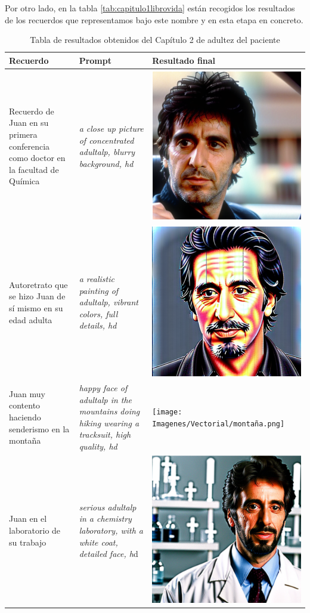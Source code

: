 Por otro lado, en la tabla \ref*{tab:capitulo1librovida} están recogidos los resultados de los recuerdos que representamos bajo este nombre y en esta etapa en concreto. \\

 \begin{table}
	\centering
	\begin{tabular}{>{\centering\arraybackslash}m{5cm} >{\arraybackslash}m{5cm}>{\arraybackslash}m{5cm}}
		\textbf{Recuerdo} & \textbf{Prompt} & \textbf{Resultado final} \\
		\hline
		Recuerdo de Juan en su primera conferencia como doctor en la facultad de Química & \textit{a close up picture of concentrated adultalp, blurry background, hd} & \includegraphics[width = 0.3
		\textwidth]{Imagenes/Vectorial/padultalp.png}\\
		\hline
		Autoretrato que se hizo Juan de sí mismo en su edad adulta & \textit{a realistic painting of adultalp, vibrant colors, full details, hd} & \includegraphics[width = 0.3
		\textwidth]{Imagenes/Vectorial/autorretrato2.png}\\
		\hline
		Juan muy contento haciendo senderismo en la montaña & \textit{happy face of adultalp in the mountains doing hiking wearing a tracksuit, high quality, hd} & \texttt{[image: Imagenes/Vectorial/montaña.png]}\\
		\hline
		Juan en el laboratorio de su trabajo & \textit{serious adultalp in a chemistry laboratory, with a white coat, detailed face, h}d & \includegraphics[width = 0.3
		\textwidth]{Imagenes/Vectorial/alplab.png}\\
		\hline
	\end{tabular}
	\caption{Tabla de resultados obtenidos del Capítulo 2 de adultez del paciente}
	\label{tab:capitulo2librovida}
\end{table}
 
